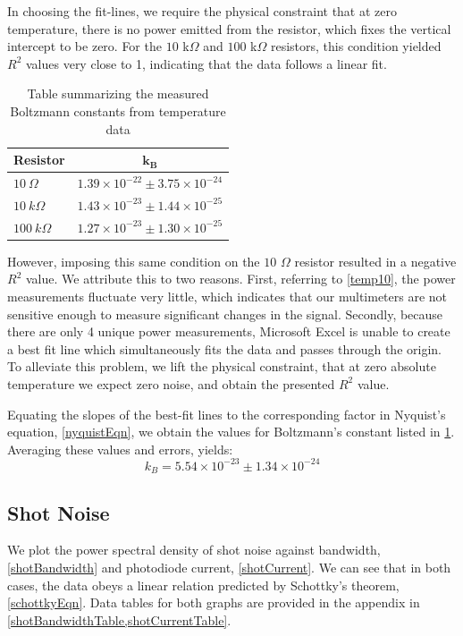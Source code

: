 \documentclass[12pt]{article}
\begin{document}
	In choosing the fit-lines, we require the physical constraint that at zero temperature, there is no power emitted from the resistor, which fixes the vertical intercept to be zero. For the $10$ k$\Omega$ and $100$ k$\Omega$ resistors, this condition yielded $R^2$ values very close to 1, indicating that the data follows a linear fit.
	
	\begin{table}
		\begin{tabular}{l c}
			\toprule
			\textbf{Resistor} & $\mathbf{k_B}$ \\ \toprule
			$10 \ \Omega$ & $1.39\times 10^{-22} \pm 3.75\times 10^{-24}$ \\
			$10 \ k\Omega$ & $1.43\times 10^{-23} \pm 1.44\times10^{-25}$\\
			$100 \ k\Omega$ & $1.27 \times 10^{-23} \pm 1.30\times10^{-25} $ \\ 
			\bottomrule			
		\end{tabular}
		\caption{Table summarizing the measured Boltzmann constants from temperature data}
		\label{BoltzmannTable}
	\end{table}
	
	However, imposing this same condition on the $10$ $\Omega$ resistor resulted in a negative $R^2$ value. We attribute this to two reasons. First, referring to \cref{temp10}, the power measurements fluctuate very little, which indicates that our multimeters are not sensitive enough to measure significant changes in the signal. Secondly, because there are only 4 unique power measurements, Microsoft Excel is unable to create a best fit line which simultaneously fits the data and passes through the origin. To alleviate this problem, we lift the physical constraint, that at zero absolute temperature we expect zero noise, and obtain the presented $R^2$ value. 
	
	Equating the slopes of the best-fit lines to the corresponding factor in Nyquist's equation, \cref{nyquistEqn}, we obtain the values for Boltzmann's constant listed in \cref{BoltzmannTable}. Averaging these values and errors, yields:
	\begin{equation}
		k_B = 5.54 \times 10^{-23} \pm 1.34 \times 10^{-24}		
	\end{equation}

	
	\subsection{Shot Noise}
	We plot the power spectral density of shot noise against bandwidth, \cref{shotBandwidth} and photodiode current, \cref{shotCurrent}. We can see that in both cases, the data obeys a linear relation predicted by Schottky's theorem, \cref{schottkyEqn}. Data tables for both graphs are provided in the appendix in \cref{shotBandwidthTable,shotCurrentTable}.
\end{document}
